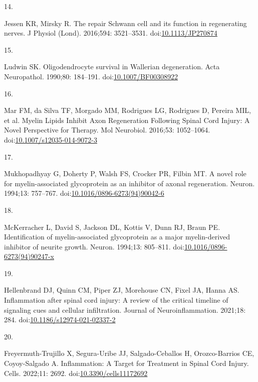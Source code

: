 \documentclass[
  12pt,
  a4paper,
]{book}
\newlength{\cslhangindent}
\newlength{\csllabelwidth}
\newenvironment{CSLReferences}[2] %
 {\begin{list}{}{%
  \setlength{\itemindent}{0pt}
  \setlength{\leftmargin}{0pt}
  \setlength{\parsep}{0pt}
  \ifodd #1
   \setlength{\leftmargin}{\cslhangindent}
   \setlength{\itemindent}{-1\cslhangindent}
  \fi
  \setlength{\itemsep}{#2\baselineskip}}}
 {\end{list}}
\newcommand{\CSLLeftMargin}[1]{\parbox[t]{\csllabelwidth}{\strut#1\strut}}
\newcommand{\CSLRightInline}[1]{\parbox[t]{\linewidth - \csllabelwidth}{\strut#1\strut}}
\begin{document}
\begin{CSLReferences}{0}{1}
\CSLLeftMargin{14. }%
\CSLRightInline{Jessen KR, Mirsky R. The repair {Schwann} cell and its function in regenerating nerves. J Physiol (Lond). 2016;594: 3521--3531. doi:\href{https://doi.org/10.1113/JP270874}{10.1113/JP270874}}

\CSLLeftMargin{15. }%
\CSLRightInline{Ludwin SK. Oligodendrocyte survival in {Wallerian} degeneration. Acta Neuropathol. 1990;80: 184--191. doi:\href{https://doi.org/10.1007/BF00308922}{10.1007/BF00308922}}

\CSLLeftMargin{16. }%
\CSLRightInline{Mar FM, da Silva TF, Morgado MM, Rodrigues LG, Rodrigues D, Pereira MIL, et al. Myelin {Lipids Inhibit Axon Regeneration Following Spinal Cord Injury}: A {Novel Perspective} for {Therapy}. Mol Neurobiol. 2016;53: 1052--1064. doi:\href{https://doi.org/10.1007/s12035-014-9072-3}{10.1007/s12035-014-9072-3}}

\CSLLeftMargin{17. }%
\CSLRightInline{Mukhopadhyay G, Doherty P, Walsh FS, Crocker PR, Filbin MT. A novel role for myelin-associated glycoprotein as an inhibitor of axonal regeneration. Neuron. 1994;13: 757--767. doi:\href{https://doi.org/10.1016/0896-6273(94)90042-6}{10.1016/0896-6273(94)90042-6}}

\CSLLeftMargin{18. }%
\CSLRightInline{McKerracher L, David S, Jackson DL, Kottis V, Dunn RJ, Braun PE. Identification of myelin-associated glycoprotein as a major myelin-derived inhibitor of neurite growth. Neuron. 1994;13: 805--811. doi:\href{https://doi.org/10.1016/0896-6273(94)90247-x}{10.1016/0896-6273(94)90247-x}}

\CSLLeftMargin{19. }%
\CSLRightInline{Hellenbrand DJ, Quinn CM, Piper ZJ, Morehouse CN, Fixel JA, Hanna AS. Inflammation after spinal cord injury: A review of the critical timeline of signaling cues and cellular infiltration. Journal of Neuroinflammation. 2021;18: 284. doi:\href{https://doi.org/10.1186/s12974-021-02337-2}{10.1186/s12974-021-02337-2}}

\CSLLeftMargin{20. }%
\CSLRightInline{Freyermuth-Trujillo X, Segura-Uribe JJ, Salgado-Ceballos H, Orozco-Barrios CE, Coyoy-Salgado A. Inflammation: {A Target} for {Treatment} in {Spinal Cord Injury}. Cells. 2022;11: 2692. doi:\href{https://doi.org/10.3390/cells11172692}{10.3390/cells11172692}}


\end{CSLReferences}
\end{document}
